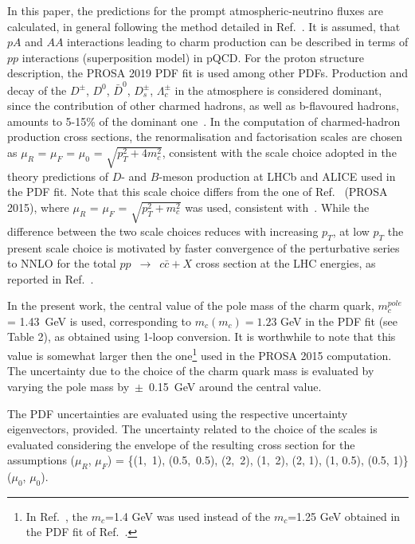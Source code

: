 In this paper, the predictions for the prompt atmospheric-neutrino fluxes are calculated, in general following the method detailed in Ref.~\cite{Garzelli:2016xmx}. It is assumed, that $pA$ and $AA$ interactions leading to charm production can be described in terms of $pp$ interactions (superposition model) in pQCD. For the proton structure description, the PROSA 2019 PDF fit is used among other PDFs.
Production and decay of the $D^\pm$, $D^0$, $\bar{D}^0$, $D_s^\pm$, $\Lambda_c^\pm$ in the atmosphere is considered dominant, 
since the contribution of other charmed hadrons, as well as b-flavoured hadrons, amounts to 5-15\% of the dominant one~\cite{Bhattacharya:2016jce}. In the computation of charmed-hadron production cross sections, the renormalisation and factorisation scales are chosen as $\mu_R$ = $\mu_F$ = $\mu_0$ = $\sqrt{p_T^2 + 4 m_c^2}$, consistent with the scale choice adopted in the theory predictions of $D$- and $B$-meson production at LHCb and ALICE used in the PDF fit. Note that this scale choice differs from the one of Ref.~\cite{Garzelli:2016xmx} (PROSA 2015), where $\mu_R$ = $\mu_F$ = $\sqrt{p_T^2 + m_c^2}$ was used, consistent with~\cite{Zenaiev:2015rfa}. While the difference between the two scale choices reduces with increasing $p_T$, at low $p_T$ the present scale choice is motivated by faster convergence of the perturbative series to NNLO for the total $pp$~$\rightarrow$~$c\bar{c} + X$ cross section at the LHC energies, as reported in Ref.~\cite{Garzelli:2015psa}. 

In the present work, the central value of the pole mass of the charm quark, $m_c^{pole}$ = 1.43~GeV is used, corresponding to $m_c(m_c) = 1.23$ GeV in the PDF fit (see Table 2), as obtained using 1\nobreakdash-loop conversion. It is worthwhile to note that this value is somewhat larger then the one\footnote{In Ref.~\cite{Garzelli:2016xmx}, the $m_c$=1.4 GeV was used instead of the $m_c$=1.25 GeV obtained in the PDF fit of Ref.~\cite{Zenaiev:2015rfa}.} used in the PROSA 2015 computation.  
The uncertainty due to the choice of the charm quark mass is evaluated by varying the pole mass by~$\pm$~0.15~GeV around the central value.

The PDF uncertainties are evaluated using the respective uncertainty eigenvectors, provided. 
The uncertainty related to the choice of the scales is evaluated considering the envelope of the resulting cross section for the assumptions ($\mu_R$, $\mu_F$) = \{(1,~1), (0.5,~0.5), (2,~2), (1,~2), (2, 1), (1, 0.5), (0.5, 1)\} ($\mu_0$, $\mu_0$). 
  
